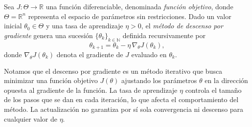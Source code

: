 \begin{definition}
\label{def:descenso-gradiente}
    Sea $J : \Theta \to \mathbb{R}$ una función diferenciable, denominada \textit{función objetivo}, donde $\Theta=\mathbb{R}^n$ representa el espacio de parámetros sin restricciones.
    Dado un valor inicial $\theta_0 \in \Theta$ y una tasa de aprendizaje $\eta > 0$, el \textit{método de descenso por gradiente} genera una sucesión
    $\{ \theta_k \}_{k \in \mathbb{N}}$ definida recursivamente por
    \[
        \theta_{k+1} = \theta_k - \eta \, \nabla_\theta J(\theta_k),
    \]
    donde $\nabla_\theta J(\theta_k)$ denota el gradiente de $J$ evaluado en $\theta_k$.
\end{definition}

Notamos que el descenso por gradiente es un método iterativo que busca minimizar una función objetivo $J(\theta)$ ajustando los parámetros $\theta$ en la dirección opuesta al gradiente de la función. La tasa de aprendizaje $\eta$ controla el tamaño de los pasos que se dan en cada iteración, lo que afecta el comportamiento del método. La actualización no garantiza por sí sola convergencia ni descenso para cualquier valor de $\eta$.


